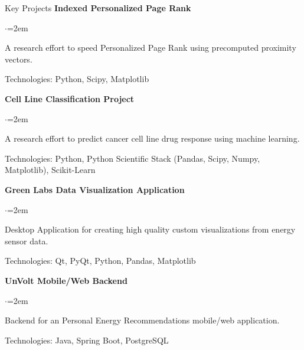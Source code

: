 \documentclass{resume} %
\begin{document}
\begin{rSection}{Key Projects}
{\bf Indexed Personalized Page Rank}
\begin{list}{$\cdot$}{\leftmargin=2em}
\vspace{-.5em}
\item A research effort to speed Personalized Page Rank using precomputed proximity vectors.
\vspace{-.5em}
\item Technologies: Python, Scipy, Matplotlib
\vspace{-.5em}
\end{list}

{\bf Cell Line Classification Project}
\begin{list}{$\cdot$}{\leftmargin=2em}
\vspace{-.5em}
\item A research effort to predict cancer cell line drug response using machine learning.
\vspace{-.5em}
\item Technologies: Python, Python Scientific Stack (Pandas, Scipy, Numpy, Matplotlib), Scikit-Learn
\vspace{-.5em}
\end{list}

{\bf Green Labs Data Visualization Application}

\begin{list}{$\cdot$}{\leftmargin=2em}
\vspace{-.5em}
\item Desktop Application for creating high quality custom visualizations from energy sensor data.
\vspace{-.5em}
\item Technologies: Qt, PyQt, Python, Pandas, Matplotlib
\vspace{-.5em}
\end{list}

{\bf UnVolt Mobile/Web Backend}
\begin{list}{$\cdot$}{\leftmargin=2em}
\vspace{-.5em}
\item Backend for an Personal Energy Recommendations mobile/web application.
\vspace{-.5em}
\item Technologies: Java, Spring Boot, PostgreSQL
\vspace{-.5em}
\end{list}
\end{rSection}
\end{document}
